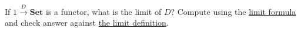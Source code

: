 If $1 \xrightarrow{D}\mathbf{Set}$ is a functor, what is the limit of $D$? Compute using the \hyperref[P3.95]{limit formula} and check answer against \hyperref[D3.92b]{the limit definition}.